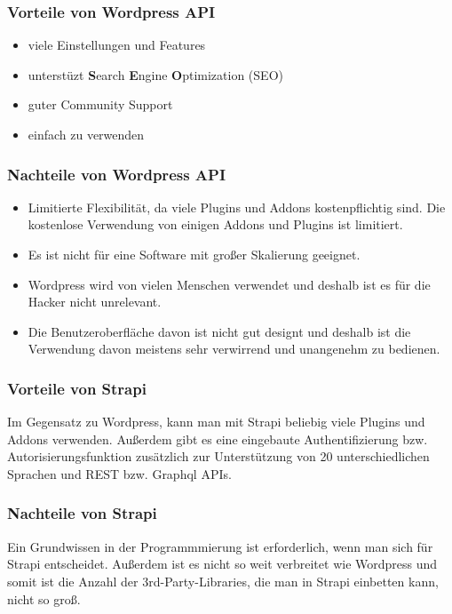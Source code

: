 \subsubsection{Vorteile von Wordpress API}

\begin{itemize}
    \item viele Einstellungen und Features
    \item unterstüzt \textbf{S}earch \textbf{E}ngine \textbf{O}ptimization (SEO)
    \item guter Community Support
    \item einfach zu verwenden
\end{itemize}
\cite{strapi-vs-wordpress}

\subsubsection{Nachteile von Wordpress API}
\begin{itemize}
    \item  Limitierte Flexibilität, da viele Plugins und Addons kostenpflichtig sind.
          Die kostenlose Verwendung von einigen Addons und Plugins ist limitiert.
    \item Es ist nicht für eine Software mit großer Skalierung geeignet.
    \item Wordpress wird von vielen Menschen verwendet und deshalb ist es für die Hacker nicht unrelevant.
    \item Die Benutzeroberfläche davon ist nicht gut designt und deshalb ist die Verwendung davon meistens sehr verwirrend und unangenehm zu bedienen.
\end{itemize}
\cite{strapi-vs-wordpress}

\subsubsection{Vorteile von Strapi}

Im Gegensatz zu Wordpress, kann man mit Strapi beliebig viele Plugins und Addons
verwenden. Außerdem gibt es eine eingebaute Authentifizierung bzw. Autorisierungsfunktion
zusätzlich zur Unterstützung von 20 unterschiedlichen Sprachen und REST
bzw. Graphql APIs.
\cite{strapi-vs-wordpress}

\subsubsection{Nachteile von Strapi}
Ein Grundwissen in der Programmmierung ist erforderlich, wenn man sich für Strapi
entscheidet. Außerdem ist es nicht so weit verbreitet wie Wordpress und somit ist die Anzahl
der 3rd-Party-Libraries, die man in Strapi einbetten kann, nicht so groß.
\cite{strapi-vs-wordpress}

